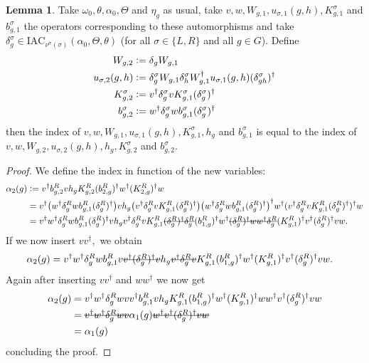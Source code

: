 \documentclass[12pt,a4paper,twoside]{article}
\newcommand{\stkout}[1]{\ifmmode\text{\sout{\ensuremath{#1}}}\else\sout{#1}\fi}
\newcommand{\defeq}{\vcentcolon=}
\let\originalleft\left
\let\originalright\right
\renewcommand{\left}{\mathopen{}\mathclose\bgroup\originalleft}
\renewcommand{\right}{\aftergroup\egroup\originalright}
\theoremstyle{definition}
\newtheorem{lemma}[theorem]{Lemma}
\numberwithin{equation}{section}
\begin{document}
\begin{lemma}\label{lem:TransformationUnderDeltaTwoTranslations}
	Take $\omega_0,\theta,\alpha_0,\Theta$ and $\eta_g$ as usual, take $v,w,W_{g,1},u_{\sigma,1}(g,h),K_{g,1}^\sigma$ and $b_{g,1}^\sigma$ the operators corresponding to these automorphisms and take $\delta^\sigma_g\in\textrm{IAC}_{\nu^\sigma(\sigma)}(\alpha_0,\Theta,\theta)$ (for all $\sigma\in\{L,R\}$ and all $g\in G$). Define
	\begin{align}
		W_{g,2}&\defeq\delta_g W_{g,1}\\
		u_{\sigma,2}(g,h)&\defeq \delta_g^\sigma W_{g,1}\delta_h^\sigma W_{g,1}^\dagger u_{\sigma,1}(g,h)(\delta_{gh}^\sigma)^\dagger\\
		K^\sigma_{g,2}&\defeq v^\dagger \delta_g^\sigma v K_{g,1}^\sigma (\delta_g^\sigma)^\dagger\\
		b_{g,2}^\sigma&\defeq w^\dagger\delta^\sigma_g w b_{g,1}^\sigma (\delta^\sigma_g)^\dagger
	\end{align}
	then the index of $v,w,W_{g,1},u_{\sigma,1}(g,h),K_{g,1}^\sigma,h_g$ and $b_{g,1}^\sigma$ is equal to the index of $v,w,W_{g,2},u_{\sigma,2}(g,h),h_g,K_{g,2}^\sigma$ and $b_{g,2}^\sigma$.
\end{lemma}
\begin{proof}
	We define the index in function of the new variables:
	\begin{align}
		\alpha_2(g)&\defeq v^\dagger b^R_{g,2}v h_g K^R_{g,2}(b^R_{2,g})^\dagger w^\dagger (K^R_{2,g})^\dagger w\\
		&=v^\dagger \left(w^\dagger\delta^R_g w b_{g,1}^R (\delta^R_g)^\dagger\right) v h_g \left(v^\dagger \delta_g^R v K_{g,1}^R (\delta_g^R)^\dagger\right) \left(w^\dagger\delta^R_g w b_{g,1}^R (\delta^R_g)^\dagger\right)^\dagger w^\dagger (v^\dagger \delta_g^R v K_{g,1}^R (\delta_g^R)^\dagger)^\dagger w\\
		&=v^\dagger w^\dagger\delta^R_g w b_{g,1}^R (\delta^R_g)^\dagger v h_g v^\dagger \delta_g^R v K_{g,1}^R \stkout{(\delta_g^R)^\dagger \delta_g^R} (b_{1,g}^R)^\dagger w^\dagger \stkout{(\delta_g^R)^\dagger w w^\dagger \delta_g^R} (K_{g,1}^R)^\dagger v^\dagger (\delta_g^R)^\dagger v  w.
	\end{align}
	If we now insert $vv^\dagger,$ we obtain
	\begin{align}
		\alpha_2(g)&=v^\dagger w^\dagger\delta^R_g w b_{g,1}^R v\stkout{v^\dagger (\delta^R_g)^\dagger v} h_g \stkout{v^\dagger \delta_g^R v} K_{g,1}^R (b_{1,g}^R)^\dagger w^\dagger (K_{g,1}^R)^\dagger v^\dagger (\delta_g^R)^\dagger v  w.
	\end{align}
	Again after inserting $vv^\dagger$ and $ww^\dagger$ we now get
	\begin{align}
		\alpha_2(g)&=v^\dagger w^\dagger\delta^R_g w v v^\dagger b_{g,1}^R v h_g K_{g,1}^R (b_{1,g}^R)^\dagger w^\dagger (K_{g,1}^R)^\dagger ww^\dagger v^\dagger (\delta_g^R)^\dagger v  w\\
		&=\stkout{v^\dagger w^\dagger\delta^R_g w v} \alpha_1(g) \stkout{w^\dagger v^\dagger (\delta_g^R)^\dagger v  w}\\
		&=\alpha_1(g)
	\end{align}
	concluding the proof.
\end{proof}
\end{document}
